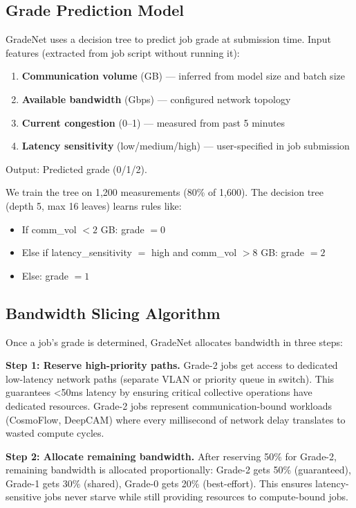 \documentclass[conference]{IEEEtran}
\begin{document}
\subsection{Grade Prediction Model}

GradeNet uses a decision tree to predict job grade at submission time. Input features (extracted from job script without running it):
\begin{enumerate}
\item \textbf{Communication volume} (GB) --- inferred from model size and batch size
\item \textbf{Available bandwidth} (Gbps) --- configured network topology
\item \textbf{Current congestion} (0--1) --- measured from past 5 minutes
\item \textbf{Latency sensitivity} (low/medium/high) --- user-specified in job submission
\end{enumerate}

Output: Predicted grade (0/1/2).

We train the tree on 1,200 measurements (80\% of 1,600). The decision tree (depth 5, max 16 leaves) learns rules like:
\begin{itemize}
\item If comm\_vol $<2$ GB: grade $= 0$
\item Else if latency\_sensitivity $= $ high and comm\_vol $>8$ GB: grade $= 2$
\item Else: grade $= 1$
\end{itemize}

\subsection{Bandwidth Slicing Algorithm}

Once a job's grade is determined, GradeNet allocates bandwidth in three steps:

\textbf{Step 1: Reserve high-priority paths.} Grade-2 jobs get access to dedicated low-latency network paths (separate VLAN or priority queue in switch). This guarantees <50ms latency by ensuring critical collective operations have dedicated resources. Grade-2 jobs represent communication-bound workloads (CosmoFlow, DeepCAM) where every millisecond of network delay translates to wasted compute cycles.

\textbf{Step 2: Allocate remaining bandwidth.} After reserving 50\% for Grade-2, remaining bandwidth is allocated proportionally: Grade-2 gets 50\% (guaranteed), Grade-1 gets 30\% (shared), Grade-0 gets 20\% (best-effort). This ensures latency-sensitive jobs never starve while still providing resources to compute-bound jobs.
\end{document}
